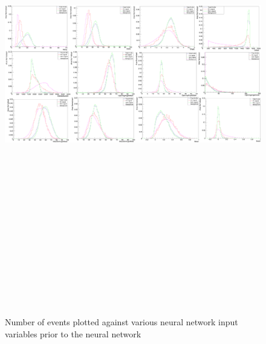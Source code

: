 \begin{landscape}
    \begin{figure}[t]
        \centering
        \hbox{\hspace{-0.5em}\includegraphics[width=24cm,height=21cm,keepaspectratio]{Figures/preNNvariablesbkg.PNG}}
        \caption{Number of events plotted against various neural network input variables prior to the neural network}
        \label{fig:pre_NN_signal}
    \end{figure}
\end{landscape}

